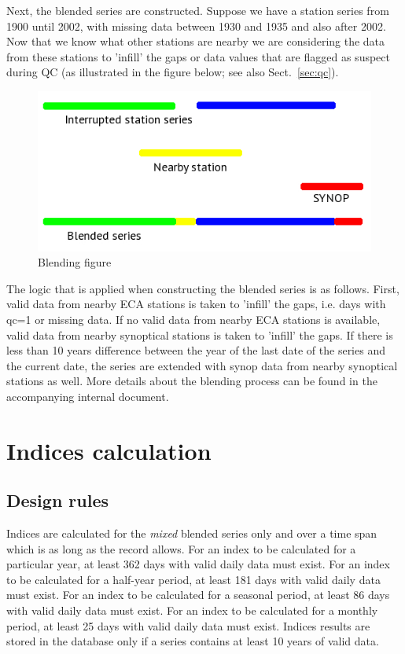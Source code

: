 \documentclass[a4paper,11pt]{article}
\begin{document}
Next, the blended series are constructed. Suppose we have a station
series from 1900 until 2002, with missing data between 1930 and 1935
and also after 2002. Now that we know what other stations are nearby
we are considering the data from these stations to 'infill' the gaps
or data values that are flagged as suspect during QC (as illustrated
in the figure below; see also Sect.~\ref{sec:qc}).

\begin{figure}[!ht]
\includegraphics[width=\textwidth]{blended_fig_new1.jpg}
\caption{Blending figure}
\label{fig:blend}
\end{figure}

The logic that is applied when constructing the blended series is as
follows. First, valid data from nearby ECA stations is taken to
'infill' the gaps, i.e. days with qc=1 or missing data. If no valid
data from nearby ECA stations is available, valid data from nearby
synoptical stations is taken to 'infill' the gaps. If there is less
than 10 years difference between the year of the last date of the
series and the current date, the series are extended with synop data
from nearby synoptical stations as well. More details about the
blending process can be found in the accompanying internal document.

\section{Indices calculation}
\label{sec:indices}

\subsection{Design rules}
\label{sec:indicesrules}

Indices are calculated for the \emph{mixed} blended series only and
over a time span which is as long as the record allows.
For an index to be calculated for a
particular year, at least 362 days with valid daily data must
exist. For an index to be calculated for a half-year period, at least
181 days with valid daily data must exist. For an index to be
calculated for a seasonal period, at least 86 days with valid daily
data must exist. For an index to be
calculated for a monthly period, at least 25 days with valid daily
data must exist. Indices results are stored in the database only if a
series contains at least 10 years of valid data. 
\end{document}
